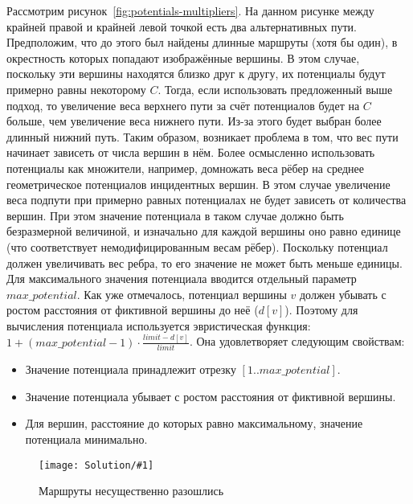 Рассмотрим рисунок~\ref{fig:potentials-multipliers}. На данном рисунке
между крайней правой и крайней левой точкой есть два альтернативных
пути. Предположим, что до этого был найдены длинные маршруты (хотя бы
один), в окрестность которых попадают изображённые вершины. В этом
случае, поскольку эти вершины находятся близко друг к другу, их
потенциалы будут примерно равны некоторому $C$. Тогда, если
использовать предложенный выше подход, то увеличение веса верхнего
пути за счёт потенциалов будет на $C$ больше, чем увеличение веса
нижнего пути. Из-за этого будет выбран более длинный нижний путь.
Таким образом, возникает проблема в том, что вес пути начинает
зависеть от числа вершин в нём. Более осмысленно использовать
потенциалы как множители, например, домножать веса рёбер на среднее
геометрическое потенциалов инцидентных вершин. В этом случае
увеличение веса подпути при примерно равных потенциалах не будет
зависеть от количества вершин. При этом значение потенциала в таком
случае должно быть безразмерной величиной, и изначально для каждой
вершины оно равно единице (что соответствует немодифицированным весам
рёбер). Поскольку потенциал должен увеличивать вес ребра, то его
значение не может быть меньше единицы. Для максимального значения
потенциала вводится отдельный параметр $max\_potential$. Как уже
отмечалось, потенциал вершины $v$ должен убывать с ростом расстояния
от фиктивной вершины до неё ($d[v]$). Поэтому для вычисления
потенциала используется эвристическая функция:
$1 + (max\_potential - 1) \cdot \frac{limit - d[v]}{limit}$. Она
удовлетворяет следующим свойствам:
\begin{itemize}
    \item Значение потенциала принадлежит отрезку $[1 .. max\_potential]$.
    \item Значение потенциала убывает с ростом расстояния от фиктивной
      вершины.
    \item Для вершин, расстояние до которых равно максимальному, значение
      потенциала минимально.
\end{itemize}

\newcommand{\weightsonpathpicture}[1]{
    \begin{center}
    \texttt{[image: Solution/\#1]}
    \end{center}
}

\begin{figure}
    \weightsonpathpicture{weights-on-path-bad}
    \caption{Маршруты несущественно разошлись}
    \label{fig:weights-on-path-bad}
\end{figure}

